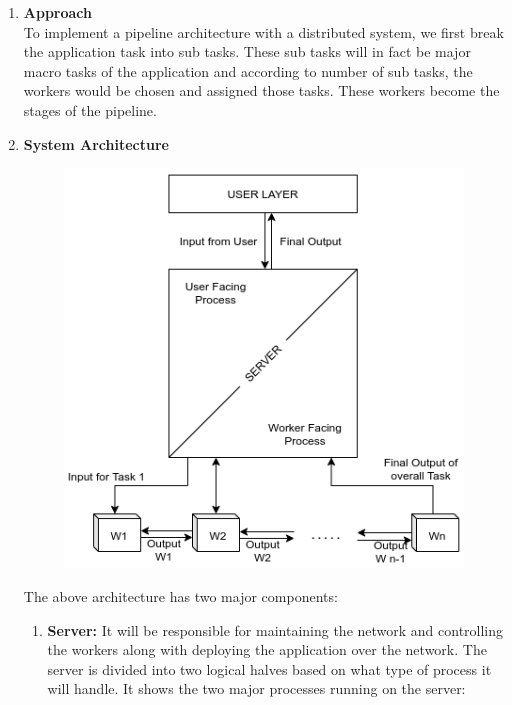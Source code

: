 \vspace*{5mm}

\begin{enumerate}
	\item {
		\textbf{ \large Approach} \\
		
		To implement a pipeline architecture with a distributed system, we first break the application task into sub tasks. These sub tasks will in fact be major macro tasks of the application and according to number of sub tasks, the workers would be chosen and assigned those tasks. These workers become the stages of the pipeline. 
	}

	\item {
		\textbf{ \large System Architecture} \\
		
		\begin{figure}[!h]
			\includegraphics[scale=1]{img/arch.png}
		\end{figure}
	
		\vspace*{3mm}
		
		\pagebreak
		
		The above architecture has two  major components:
		
		\begin{enumerate}
			\item {
				\textbf{Server:} It will be responsible for maintaining the network and controlling the workers along with deploying the application over the network. The server is divided into two logical halves based on what type of process it will handle. It shows the two major processes running on the server:
				
}
\end{enumerate}}
\end{enumerate}
